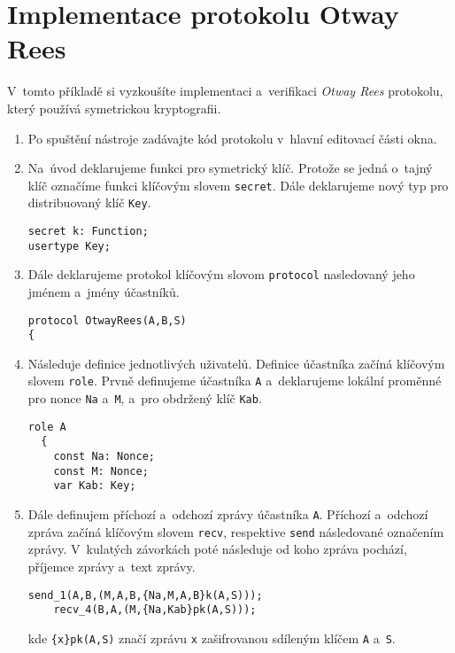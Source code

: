 \section{Implementace protokolu Otway Rees}
V~tomto příkladě si vyzkoušíte implementaci a~verifikaci \emph{Otway Rees}
protokolu, který používá symetrickou kryptografii.

\begin{enumerate}
  \item Po spuštění nástroje zadávajte kód protokolu v~hlavní editovací části okna.

  \item Na~úvod deklarujeme funkci pro symetrický klíč. Protože se jedná o~tajný
  klíč označíme funkci klíčovým slovem \texttt{secret}. Dále deklarujeme nový typ
  pro distribuovaný klíč \texttt{Key}.
  \begin{lstlisting}[name=OtwayRees]
secret k: Function;
usertype Key;
  \end{lstlisting}

  \item Dále deklarujeme protokol klíčovým slovom \texttt{protocol} nasledovaný jeho jménem a~jmény účastníků.
  \begin{lstlisting}[name=OtwayRees]
protocol OtwayRees(A,B,S)
{
  \end{lstlisting}

  \item Následuje definice jednotlivých uživatelů. Definice účastníka začíná klíčovým slovem \texttt{role}.
  Prvně definujeme účastníka \texttt{A} a~deklarujeme lokální proměnné pro nonce \texttt{Na} a~\texttt{M},
  a~pro obdržený klíč \texttt{Kab}.
  \begin{lstlisting}[name=OtwayRees]
  role A
  {
    const Na: Nonce;
    const M: Nonce;
    var Kab: Key;
  \end{lstlisting}

  \item Dále definujem příchozí a~odchozí zprávy účastníka \texttt{A}.
  Příchozí a~odchozí zpráva začíná klíčovým slovem \texttt{recv}, respektive \texttt{send} následované označením zprávy.
  V~kulatých závorkách poté následuje od koho zpráva pochází, příjemce zprávy a~text zprávy.
  \begin{lstlisting}[name=OtwayRees]
    send_1(A,B,(M,A,B,{Na,M,A,B}k(A,S)));
    recv_4(B,A,(M,{Na,Kab}pk(A,S)));
  \end{lstlisting}
  kde \texttt{\{x\}pk(A,S)} značí zprávu \texttt{x} zašifrovanou sdíleným klíčem \texttt{A} a~\texttt{S}.


\end{enumerate}
